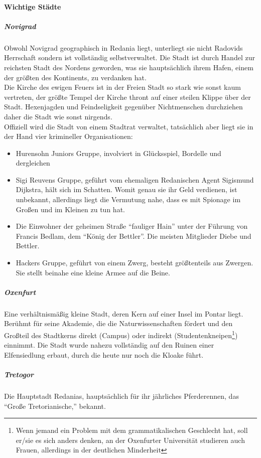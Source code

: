 \documentclass[parskip=full,11pt]{scrreport}
\begin{document}
	\paragraph{Wichtige Städte}
	\subparagraph{Novigrad}
	Obwohl Novigrad geographisch in Redania liegt, unterliegt sie nicht Radovids Herrschaft sondern ist vollständig selbstverwaltet. Die Stadt ist durch Handel zur reichsten Stadt des Nordens geworden, was sie hauptsächlich ihrem Hafen, einem der größten des Kontinents, zu verdanken hat.\\
	Die Kirche des ewigen Feuers ist in der Freien Stadt so stark wie sonst kaum vertreten, der größte Tempel der Kirche thront auf einer steilen Klippe über der Stadt. Hexenjagden und Feindseligkeit gegenüber Nichtmenschen durchziehen daher die Stadt wie sonst nirgends.\\
	Offiziell wird die Stadt von einem Stadtrat verwaltet, tatsächlich aber liegt sie in der Hand vier krimineller Organisationen:
	\begin{itemize}
		\item Hurensohn Juniors Gruppe, involviert in Glücksspiel, Bordelle und dergleichen
		\item Sigi Reuvens Gruppe, geführt vom ehemaligen Redanischen Agent Sigismund Dijkstra, hält sich im Schatten. Womit genau sie ihr Geld verdienen, ist unbekannt, allerdings liegt die Vermutung nahe, dass es mit Spionage im Großen und im Kleinen zu tun hat.
		\item Die Einwohner der geheimen Straße ``fauliger Hain'' unter der Führung von Francis Bedlam, dem ``König der Bettler''. Die meisten Mitglieder Diebe und Bettler.
		\item Hackers Gruppe, geführt von einem Zwerg, besteht größtenteils aus Zwergen. Sie stellt beinahe eine kleine Armee auf die Beine.
	\end{itemize}
	\subparagraph{Oxenfurt}
	Eine verhältnismäßig kleine Stadt, deren Kern auf einer Insel im Pontar liegt. Berühmt für seine Akademie, die die Naturwissenschaften fördert und den Großteil des Stadtkerns direkt (Campus) oder indirekt (Studentenkneipen\footnote{Wenn jemand ein Problem mit dem grammatikalischen Geschlecht hat, soll er/sie es sich anders denken, an der Oxenfurter Universität studieren auch Frauen, allerdings in der deutlichen Minderheit}) einnimmt. Die Stadt wurde nahezu vollständig auf den Ruinen einer Elfensiedlung erbaut, durch die heute nur noch die Kloake führt.
	\subparagraph{Tretogor}
	Die Hauptstadt Redanias, hauptsächlich für ihr jährliches Pferderennen, das ``Große Tretorianische,'' bekannt.
\end{document}
